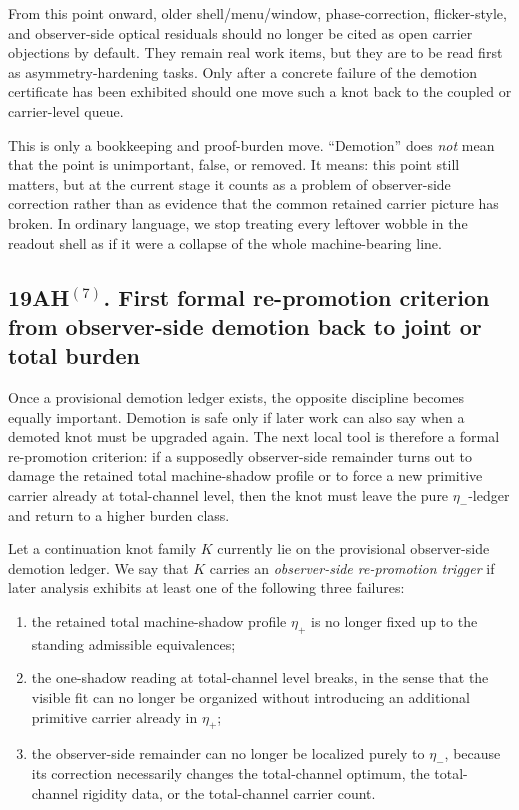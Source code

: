 \begin{corollary}
From this point onward, older shell/menu/window, phase-correction, flicker-style, and observer-side optical residuals should no longer be cited as open carrier objections by default. They remain real work items, but they are to be read first as asymmetry-hardening tasks. Only after a concrete failure of the demotion certificate has been exhibited should one move such a knot back to the coupled or carrier-level queue.
\end{corollary}

\begin{remark}
This is only a bookkeeping and proof-burden move. ``Demotion'' does \emph{not} mean that the point is unimportant, false, or removed. It means: this point still matters, but at the current stage it counts as a problem of observer-side correction rather than as evidence that the common retained carrier picture has broken. In ordinary language, we stop treating every leftover wobble in the readout shell as if it were a collapse of the whole machine-bearing line.
\end{remark}

\subsection*{19AH$^{(7)}$. First formal re-promotion criterion from observer-side demotion back to joint or total burden}
Once a provisional demotion ledger exists, the opposite discipline becomes equally important. Demotion is safe only if later work can also say when a demoted knot must be upgraded again. The next local tool is therefore a formal re-promotion criterion: if a supposedly observer-side remainder turns out to damage the retained total machine-shadow profile or to force a new primitive carrier already at total-channel level, then the knot must leave the pure \(\eta_-\)-ledger and return to a higher burden class.

\begin{definition}
Let a continuation knot family \(K\) currently lie on the provisional observer-side demotion ledger. We say that \(K\) carries an \emph{observer-side re-promotion trigger} if later analysis exhibits at least one of the following three failures:
\begin{enumerate}[leftmargin=2em]
 \item the retained total machine-shadow profile \(\eta_+\) is no longer fixed up to the standing admissible equivalences;
 \item the one-shadow reading at total-channel level breaks, in the sense that the visible fit can no longer be organized without introducing an additional primitive carrier already in \(\eta_+\);
 \item the observer-side remainder can no longer be localized purely to \(\eta_-\), because its correction necessarily changes the total-channel optimum, the total-channel rigidity data, or the total-channel carrier count.
\end{enumerate}
\end{definition}

